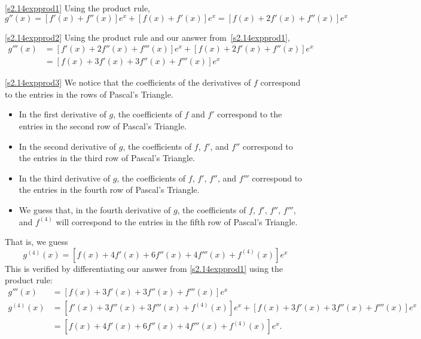 \begin{solution}
\eqref{s2.14expprod1} Using the product rule, \[g''(x)=[f'(x)+f''(x)]e^x+[f(x)+f'(x)]e^x=[f(x)+2f'(x)+f''(x)]e^x\]

\eqref{s2.14expprod2}  Using the product rule and our answer from~\eqref{s2.14expprod1},
\begin{align*}
g'''(x)&=[f'(x)+2f''(x)+f'''(x)]e^x+[f(x)+2f'(x)+f''(x)]e^x\\
&=[f(x)+3f'(x)+3f''(x)+f'''(x)]e^x
\end{align*}

\eqref{s2.14expprod3} We notice that the coefficients of the derivatives of $f$ correspond to the entries in the rows of Pascal's Triangle.
\begin{center}\end{center}
\begin{itemize}
\item In the first derivative of $g$, the coefficients of $f$ and $f'$ correspond to the entries in the second row of Pascal's Triangle.
\item In the second derivative of $g$, the coefficients of $f$, $f'$, and $f''$ correspond to the entries in the third row of Pascal's Triangle.
\item In the third derivative of $g$, the coefficients of $f$, $f'$, $f''$, and $f'''$ correspond to the entries in the fourth row of Pascal's Triangle.
\item We guess that, in the fourth derivative of $g$, the coefficients of $f$, $f'$, $f''$, $f'''$, and $f^{(4)}$ will correspond to the entries in the fifth row of Pascal's Triangle.
\end{itemize}
That is, we guess
\[g^{(4)}(x)=[f(x)+4f'(x)+6f''(x)+4f'''(x)+f^{(4)}(x)]e^x\]
This is verified by differentiating our answer from \eqref{s2.14expprod1} using the product rule:
\begin{align*}
g'''(x)&=[f(x)+3f'(x)+3f''(x)+f'''(x)]e^x\\
g^{(4)}(x)&=[f'(x)+3f''(x)+3f'''(x)+f^{(4)}(x)]e^x+[f(x)+3f'(x)+3f''(x)+f'''(x)]e^x\\
&=[f(x)+4f'(x)+6f''(x)+4f'''(x)+f^{(4)}(x)]e^x.
\end{align*}
\end{solution}

